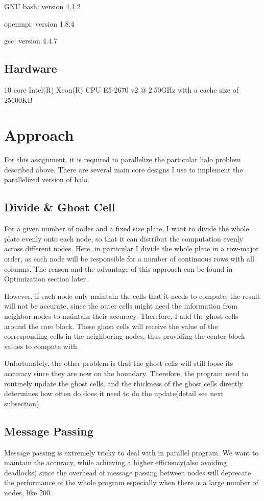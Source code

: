 \documentclass{cs4444}
\begin{document}
	GNU bash: version 4.1.2
	
	openmpi: version 1.8.4
	
	gcc: version 4.4.7

\subsection{Hardware}
	10 core Intel(R) Xeon(R) CPU E5-2670 v2 @ 2.50GHz with a cache size of 25600KB
	
\section{Approach}
	For this assignment, it is required to parallelize the particular halo problem described above. There are several main core designs I use to implement the parallelized version of halo.
	\subsection{Divide \& Ghost Cell}
		For a given number of nodes and a fixed size plate, I want to divide the   
			whole plate evenly onto each node, so that it can distribut the computation evenly across different nodes. Here, in particular I divide the whole plate in a row-major order, as each node will be responsible for a number of continuous rows with 
				all columns. The reason and the advantage of this approach can be found in Optimization section later.
				
		However, if each node only maintain the cells that it needs to compute, the result will not be accurate, since the outer cells might need the information from neighbor nodes to maintain their accuracy. Therefore, I add the ghost cells around the core block. These ghost cells will receive the value of the corresponding cells in the neighboring nodes, thus providing the center block values to compute with. 
		
		Unfortunately, the other problem is that the ghost cells will still loose its accuracy since they are now on the boundary. Therefore, the program need to routinely update the ghost cells, and the thickness of the ghost cells directly determines how often do does it need to do the update(detail see next subsection).
		
		\subsection{Message Passing}
		Message passing is extremely tricky to deal with in parallel program. We want to maintain the accuracy, while achieving a higher efficiency(also avoiding deadlocks) since the overhead of message passing between nodes will deprecate the performance of the whole program especially when there is a large number of nodes, like 200.
\end{document}
